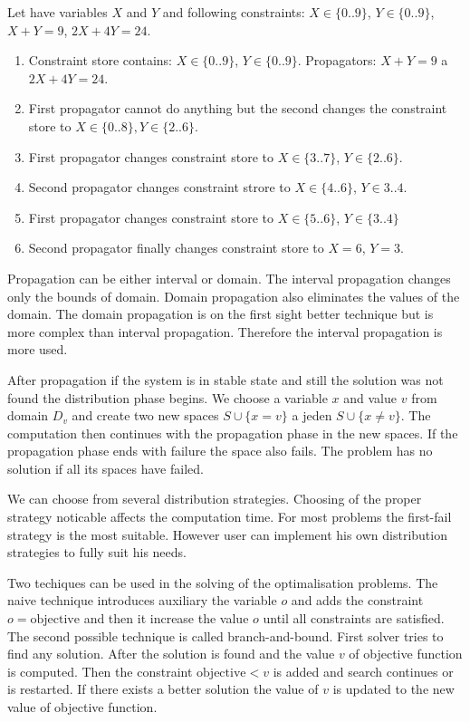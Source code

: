 \begin{example} Let have variables $X$ and $Y$ and following constraints: $X \in \{0..9\}$, $Y \in \{0..9\}$, 
  $X+Y = 9$, $2X + 4Y = 24$. 
\begin{enumerate}
  \item Constraint store contains: $X \in \{0..9\}$, $Y \in \{0..9\}$. Propagators: $X+Y = 9$ a $2X + 4Y = 24$.
  \item	First propagator cannot do anything but the second changes the constraint store to $X \in \{0..8\}, Y \in \{2..6\}$.
  \item	First propagator changes constraint store to $X \in \{3..7\}$, $Y \in \{2..6\}$.
  \item	Second propagator changes constraint strore to $X \in \{4..6\}$, $Y \in 3..4$.
  \item	First propagator changes constraint store to $X \in \{5..6\}$, $Y \in \{3..4\}$
  \item	Second propagator finally changes constraint store to $X = 6$, $Y = 3$.
\end{enumerate}
\end{example}

Propagation can be either interval or domain. The interval propagation changes only 
the bounds of domain. Domain propagation also eliminates the values of the domain.
The domain propagation is on the first sight better technique but is more complex
than interval propagation. Therefore the interval propagation is more used.

After propagation if the system is in stable state and still the solution was not found
the distribution phase begins. We choose a variable $x$ and value $v$ from domain
 $D_v$ and create two new spaces $S \cup \{x = v\}$ a jeden $S \cup \{x \neq v\}$.
 The computation then continues with the propagation phase in the new spaces.
 If the propagation phase ends with failure the space also fails. The problem has no
 solution if all its spaces have failed.

We can choose from several distribution strategies. Choosing of the proper strategy 
noticable affects the computation time.  For most problems the first-fail strategy is
the most suitable. However user can implement his own distribution strategies to fully
suit his needs.

Two techiques can be used in the solving of the optimalisation problems. The naive technique
introduces auxiliary the variable $o$ and adds the constraint $o = \mathrm{objective}$ and 
then it increase the value $o$ until all constraints are satisfied. The second possible
technique is called branch-and-bound. First solver tries to find any solution. After the
solution is found and the value $v$ of objective function is computed. Then the constraint
 $\mathrm{objective} < v$ is added and search continues or is restarted. If there
 exists a better solution the value of $v$ is updated to the new value of objective function.

